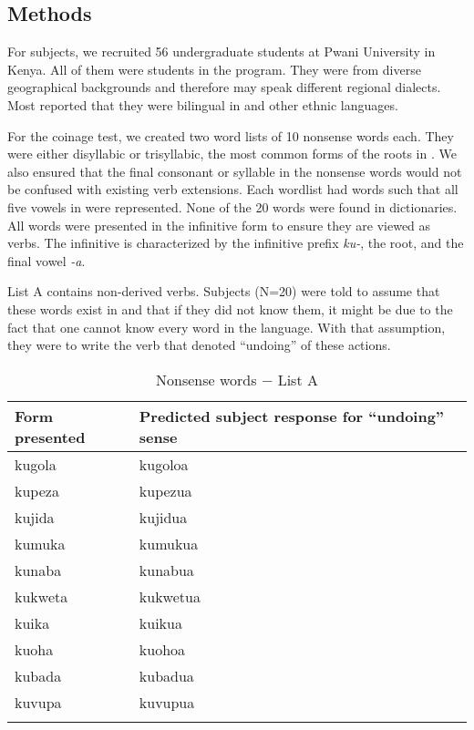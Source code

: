 \documentclass[output=paper]{langsci/langscibook}
\begin{document}
\subsection{Methods}\label{sec:ngonyaningowa:4.1}

For subjects, we recruited 56 undergraduate students at Pwani University in Kenya. All of them were students in the  program. They were from diverse geographical backgrounds and therefore may speak different regional dialects. Most reported that they were bilingual in  and other ethnic languages. 

For the coinage test, we created two word lists of 10 nonsense words each. They were either disyllabic or trisyllabic, the most common forms of the roots in . We also ensured that the final consonant or syllable in the nonsense words would not be confused with existing verb extensions. Each wordlist had words such that all five vowels in  were represented.  None of the 20 words were found in dictionaries. All words were presented in the infinitive form to ensure they are viewed as verbs. The infinitive is characterized by the infinitive prefix \textit{ku-}, the root, and the final vowel \textit{-a}.

List A  contains non-derived verbs. Subjects (N=20) were told to assume that these words exist in  and that if they did not know them, it might be due to the fact that one cannot know every word in the language. With that assumption, they were to write the verb that denoted “undoing” of these actions. 

\begin{table}
\begin{tabularx}{.66\textwidth}{lX}
\lsptoprule
 Form presented &  Predicted subject response 
 \newline for “undoing” sense\\
\midrule
  {kugola} &  {kugoloa}\\
 {kupeza} &  {kupezua}\\
 {kujida} &  {kujidua}\\
 {kumuka} &  {kumukua}\\
 {kunaba} &  {kunabua}\\
 {kukweta} &  {kukwetua}\\ 
 {kuika} &  {kuikua}\\
  {kuoha} &  {kuohoa}\\
  {kubada} &  {kubadua}\\
  {kuvupa} &  {kuvupua}\\
\lspbottomrule
\end{tabularx}
\caption{Nonsense words $-$ List A}
\label{tab:ngonyaningowa:1}
\end{table}
\end{document}
